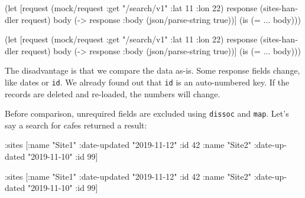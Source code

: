 \ifnarrow

\begin{english}
  \begin{clojure}
(let [request (mock/request
                :get "/search/v1"
                {:lat 11 :lon 22})
      response (sites-handler request)
      body (-> response
               :body
               (json/parse-string
                 true))]
  (is (= {...} body)))
  \end{clojure}
\end{english}

\else

\begin{english}
  \begin{clojure}
(let [request (mock/request :get "/search/v1"
                            {:lat 11 :lon 22})
      response (sites-handler request)
      body (-> response :body (json/parse-string true))]
  (is (= {...} body)))
  \end{clojure}
\end{english}

\fi

The disadvantage is that we compare the data as-is. Some response fields change, like dates or \verb|id|. We already found out that \verb|id| is an auto-numbered key. If the records are deleted and re-loaded, the numbers will change.

Before comparison, unrequired fields are excluded using \verb|dissoc| and \verb|map|. Let's say a search for cafes returned a result:

\ifnarrow

\begin{english}
  \begin{clojure}
{:sites [{:name "Site1"
          :date-updated "2019-11-12"
          :id 42}
         {:name "Site2"
          :date-updated "2019-11-10"
          :id 99}]}
  \end{clojure}
\end{english}

\else

\begin{english}
  \begin{clojure}
{:sites [{:name "Site1" :date-updated "2019-11-12" :id 42}
         {:name "Site2" :date-updated "2019-11-10" :id 99}]}
  \end{clojure}
\end{english}

\fi


